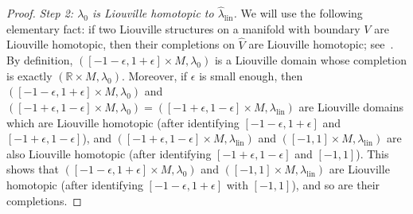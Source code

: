 \documentclass[letterpaper, 11pt]{article}
\numberwithin{equation}{section}
\newcommand{\R}{\mathbb{R}}
\begin{document}
\begin{proof}
\textit{Step 2: $\lambda_0$ is Liouville homotopic to $\widehat{\lambda}_\mathrm{lin}$.} We will use the following elementary fact: if two Liouville structures on a manifold with boundary $V$ are Liouville homotopic, then their completions on $\widehat{V}$ are Liouville homotopic; see~\cite[Lemma 11.6]{CE12}. By definition, $([-1-\epsilon, 1+\epsilon] \times M, \lambda_0)$ is a Liouville domain whose completion is exactly $(\R \times M, \lambda_0)$. Moreover, if $\epsilon$ is small enough, then $([-1-\epsilon, 1+\epsilon] \times M, \lambda_0)$ and $([-1+\epsilon, 1-\epsilon] \times M, \lambda_0) = ([-1+\epsilon, 1-\epsilon] \times M, \lambda_\mathrm{lin})$ are Liouville domains which are Liouville homotopic (after identifying $[-1-\epsilon, 1+\epsilon]$ and $[-1+\epsilon, 1-\epsilon]$), and $([-1+\epsilon, 1-\epsilon] \times M, \lambda_\mathrm{lin})$ and $([-1,1] \times M, \lambda_\mathrm{lin})$ are also Liouville homotopic (after identifying $[-1+\epsilon, 1-\epsilon]$ and $[-1,1]$). This shows that $([-1-\epsilon, 1+\epsilon] \times M, \lambda_0)$ and $([-1,1] \times M, \lambda_\mathrm{lin})$ are Liouville homotopic (after identifying $[-1-\epsilon, 1+\epsilon]$ with $[-1,1]$), and so are their completions.


\end{proof}
\end{document}

